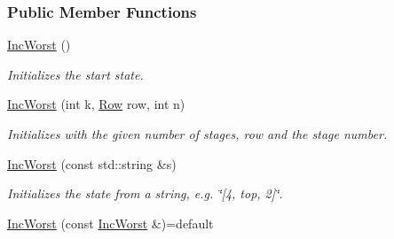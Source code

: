 \subsubsection*{Public Member Functions}
\begin{DoxyCompactItemize}
\item 
\hyperlink{structincWorst_1_1IncWorst_acacb7337675fc7ce60436915eb7ff101}{Inc\+Worst} ()\hypertarget{structincWorst_1_1IncWorst_acacb7337675fc7ce60436915eb7ff101}{}\label{structincWorst_1_1IncWorst_acacb7337675fc7ce60436915eb7ff101}

\begin{DoxyCompactList}\small\item\em Initializes the start state. \end{DoxyCompactList}\item 
\hyperlink{structincWorst_1_1IncWorst_adf4547e5c1fe712bd2590964ac8fe15d}{Inc\+Worst} (int k, \hyperlink{structincWorst_1_1IncWorst_abd5c58aa826b8edef33ff888c7d7e664}{Row} row, int n)
\begin{DoxyCompactList}\small\item\em Initializes with the given number of stages, row and the stage number. \end{DoxyCompactList}\item 
\hyperlink{structincWorst_1_1IncWorst_a6c9144a7277dcf0a1bfcef3c0426e34a}{Inc\+Worst} (const std\+::string \&s)
\begin{DoxyCompactList}\small\item\em Initializes the state from a string, e.\+g. \char`\"{}\mbox{[}4, top, 2\mbox{]}\char`\"{}. \end{DoxyCompactList}\item 
\hyperlink{structincWorst_1_1IncWorst_aca26ea88e2a41ffb66a9498ee4721166}{Inc\+Worst} (const \hyperlink{structincWorst_1_1IncWorst}{Inc\+Worst} \&)=default\hypertarget{structincWorst_1_1IncWorst_aca26ea88e2a41ffb66a9498ee4721166}{}\label{structincWorst_1_1IncWorst_aca26ea88e2a41ffb66a9498ee4721166}


\end{DoxyCompactItemize}
